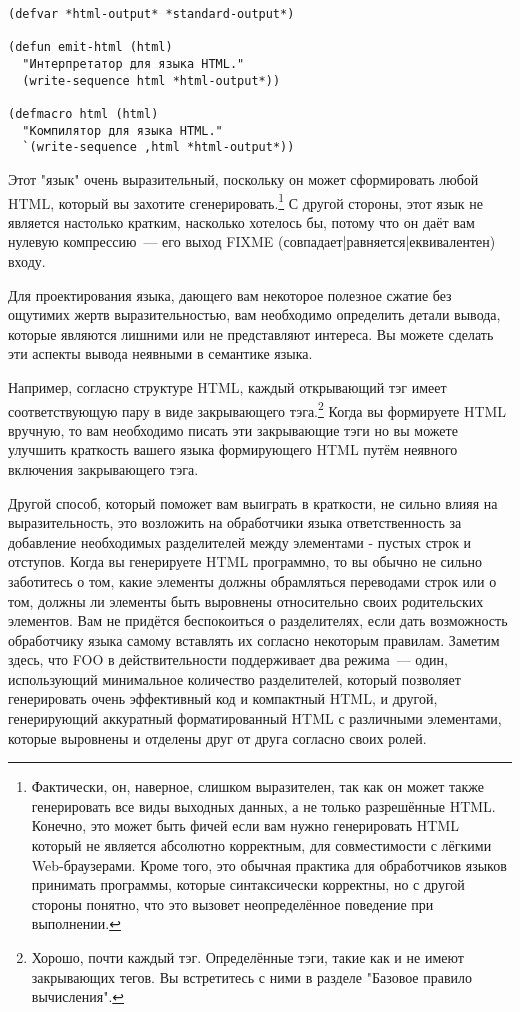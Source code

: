 \begin{lstlisting}
(defvar *html-output* *standard-output*)

(defun emit-html (html)
  "Интерпретатор для языка HTML."
  (write-sequence html *html-output*))

(defmacro html (html)
  "Компилятор для языка HTML."
  `(write-sequence ,html *html-output*))
\end{lstlisting}

Этот "язык" очень выразительный, поскольку он может сформировать любой HTML, который вы
захотите сгенерировать.\footnote{Фактически, он, наверное, слишком выразителен, так как он
  может также генерировать все виды выходных данных, а не только разрешённые
  HTML. Конечно, это может быть фичей если вам нужно генерировать HTML который не является
  абсолютно корректным, для совместимости с лёгкими Web-браузерами. Кроме того, это
  обычная практика для обработчиков языков принимать программы, которые синтаксически
  корректны, но с другой стороны понятно, что это вызовет неопределённое поведение при
  выполнении.} С другой стороны, этот язык не является настолько кратким, насколько
хотелось бы, потому что он даёт вам нулевую компрессию~--- его выход FIXME
(совпадает|равняется|еквивалентен) входу.

Для проектирования языка, дающего вам некоторое полезное сжатие без ощутимих жертв
выразительностью, вам необходимо определить детали вывода, которые являются лишними или не
представляют интереса. Вы можете сделать эти аспекты вывода неявными в семантике языка.

Например, согласно структуре HTML, каждый открывающий тэг имеет соответствующую пару в
виде закрывающего тэга.\footnote{Хорошо, почти каждый тэг. Определённые тэги, такие как
   и  не имеют закрывающих тегов.  Вы встретитесь с ними в разделе
  "Базовое правило вычисления".} Когда вы формируете HTML вручную, то вам необходимо
писать эти закрывающие тэги но вы можете улучшить краткость вашего языка формирующего HTML
путём неявного включения закрывающего тэга.

Другой способ, который поможет вам выиграть в краткости, не сильно влияя на
выразительность, это возложить на обработчики языка ответственность за добавление
необходимых разделителей между элементами - пустых строк и отступов. Когда вы генерируете
HTML программно, то вы обычно не сильно заботитесь о том, какие элементы должны
обрамляться переводами строк или о том, должны ли элементы быть выровнены относительно
своих родительских элементов. Вам не придётся беспокоиться о разделителях, если дать
возможность обработчику языка самому вставлять их согласно некоторым правилам. Заметим
здесь, что FOO в действительности поддерживает два режима~--- один, использующий
минимальное количество разделителей, который позволяет генерировать очень эффективный код
и компактный HTML, и другой, генерирующий аккуратный форматированный HTML с различными
элементами, которые выровнены и отделены друг от друга согласно своих ролей.

